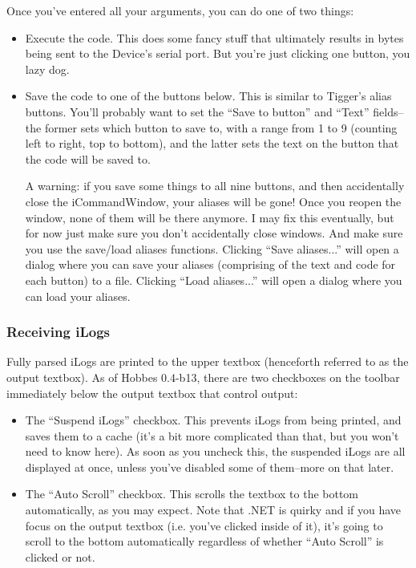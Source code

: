 Once you've entered all your arguments, you can do one of two things:
\begin{itemize}
\item Execute the code. This does some fancy stuff that ultimately results in bytes being sent to the Device's serial port. But you're just clicking one button, you lazy dog.
\item Save the code to one of the buttons below. This is similar to Tigger's alias buttons. You'll probably want to set the ``Save to button'' and ``Text'' fields--the former sets which button to save to, with a range from 1 to 9 (counting left to right, top to bottom), and the latter sets the text on the button that the code will be saved to.

A warning: if you save some things to all nine buttons, and then accidentally close the iCommandWindow, your aliases will be gone! Once you reopen the window, none of them will be there anymore. I may fix this eventually, but for now just make sure you don't accidentally close windows. And make sure you use the save/load aliases functions. Clicking ``Save aliases...'' will open a dialog where you can save your aliases (comprising of the text and code for each button) to a file. Clicking ``Load aliases...'' will open a dialog where you can load your aliases.
\end{itemize}




%
%
\subsubsection{Receiving iLogs}
\label{3.3.2}

Fully parsed iLogs are printed to the upper textbox (henceforth referred to as the output textbox). As of Hobbes 0.4-b13, there are two checkboxes on the toolbar immediately below the output textbox that control output:

\begin{itemize}
\item The ``Suspend iLogs'' checkbox. This prevents iLogs from being printed, and saves them to a cache (it's a bit more complicated than that, but you won't need to know here). As soon as you uncheck this, the suspended iLogs are all displayed at once, unless you've disabled some of them--more on that later.
\item The ``Auto Scroll'' checkbox. This scrolls the textbox to the bottom automatically, as you may expect. Note that .NET is quirky and if you have focus on the output textbox (i.e. you've clicked inside of it), it's going to scroll to the bottom automatically regardless of whether ``Auto Scroll'' is clicked or not.
\end{itemize}

